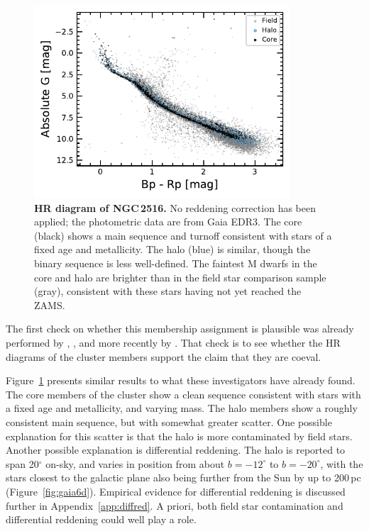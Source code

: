 \documentclass[12pt,twocolumn,tighten]{aastex63}
\begin{document}
\begin{figure}[t]
	\begin{center}
		\leavevmode
			\includegraphics[width=0.85\textwidth]{f2a.pdf}
	\end{center}
	\vspace{-0.7cm}
  \caption{ {\bf HR diagram of NGC\,2516.}
    No reddening correction has been applied; the photometric data are
    from Gaia EDR3.  The core (black) shows a main sequence and
    turnoff consistent with stars of a fixed age and metallicity.  The
    halo (blue) is similar, though the binary sequence is less
    well-defined.  The faintest M dwarfs in the core and halo are
    brighter than in the field star comparison sample (gray),
    consistent with these stars having not yet reached the ZAMS.
    \label{fig:hr}
  }
\end{figure}

The first check on whether this membership assignment is plausible was
already performed by ,
, and more recently by
\citet{meingast_2021}.  That check is to see whether the HR diagrams
of the cluster members support the claim that they are coeval.

Figure~\ref{fig:hr} presents similar results to what these
investigators have already found.  The core members of the cluster
show a clean sequence consistent with stars with a fixed age and
metallicity, and varying mass.  The halo members show a roughly
consistent main sequence, but with somewhat greater scatter.  One
possible explanation for this scatter is that the halo is more
contaminated by field stars.  Another possible explanation is
differential reddening.  The halo is reported to span 20$^\circ$
on-sky, and varies in position from about $b=-12^\circ$ to
$b=-20^\circ$, with the stars closest to the galactic plane also being
further from the Sun by up to 200\,pc (Figure~\ref{fig:gaia6d}).
Empirical evidence for differential reddening is discussed further in
Appendix~\ref{app:diffred}. A priori, both field star contamination
and differential reddening could well play a role.
\end{document}

